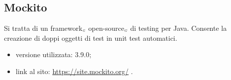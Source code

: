\subsection{Mockito}\label{LibrerieMockito}
Si tratta di un framework$_{\scaleto{G}{3pt}}$ open-source$_{\scaleto{G}{3pt}}$ di testing per Java. Consente la creazione di doppi oggetti di test in unit test automatici.

\begin{itemize}
  \item versione utilizzata: 3.9.0;
  \item link al sito: \url{https://site.mockito.org/} .
\end{itemize}
